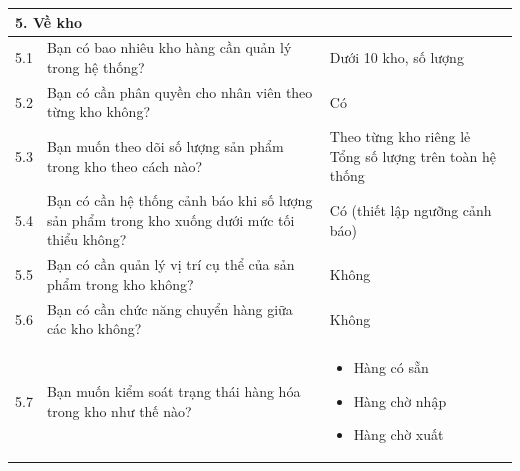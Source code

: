 \documentclass[a4paper,12pt]{report}
\begin{document}
\begin{longtable}{|c|p{8cm}|p{7cm}|}
    \hline
    \multicolumn{3}{|l|}{\textbf{5. Về kho}}                                                                                                                                                                                                                          \\
    \hline
    5.1          & Bạn có bao nhiêu kho hàng cần quản lý trong hệ thống?                                                                   & Dưới 10 kho, số lượng                                                                                                    \\
    \hline
    5.2          & Bạn có cần phân quyền cho nhân viên theo từng kho không?                                                                & Có                                                                                                                       \\
    \hline
    5.3          & Bạn muốn theo dõi số lượng sản phẩm trong kho theo cách nào?                                                            & Theo từng kho riêng lẻ Tổng số lượng trên toàn hệ thống                                                                  \\
    \hline
    5.4          & Bạn có cần hệ thống cảnh báo khi số lượng sản phẩm trong kho xuống dưới mức tối thiểu không?                            & Có (thiết lập ngưỡng cảnh báo)                                                                                           \\
    \hline
    5.5          & Bạn có cần quản lý vị trí cụ thể của sản phẩm trong kho không?                                                          & Không                                                                                                                    \\
    \hline
    5.6          & Bạn có cần chức năng chuyển hàng giữa các kho không?                                                                    & Không                                                                                                                    \\
    \hline
    5.7          & Bạn muốn kiểm soát trạng thái hàng hóa trong kho như thế nào?                                                           &
    \begin{itemize}
        \item Hàng có sẵn
        \item Hàng chờ nhập
        \item Hàng chờ xuất

\end{itemize}
\end{longtable}
\end{document}
